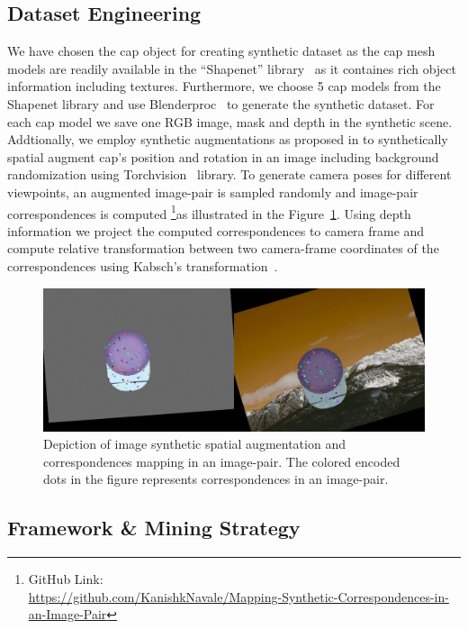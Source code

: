 \subsection{Dataset Engineering}

We have chosen the cap object for creating synthetic dataset as the cap mesh models are readily available in the ``Shapenet'' library~\cite{chang2015shapenet}
as it containes rich object information including textures. Furthermore, we choose 5 cap models from the Shapenet library and use
Blenderproc~\cite{blenderproc} to generate the synthetic dataset.
For each cap model we save one RGB image, mask and depth in the synthetic scene. Addtionally, we employ synthetic augmentations as proposed in \cite{adrian2022efficient}
to synthetically spatial augment cap's position and rotation in an image including background randomization
using Torchvision~\cite{marcel2010torchvision} library. To generate camera poses for different viewpoints,
an augmented image-pair is sampled randomly and image-pair correspondences is computed
\footnote[1]{GitHub Link: \\ \url{https://github.com/KanishkNavale/Mapping-Synthetic-Correspondences-in-an-Image-Pair}}as illustrated in the Figure~\ref{fig:image_augs}.
Using depth information we project the computed correspondences to camera frame and compute relative transformation between two camera-frame coordinates of the correspondences
using Kabsch's transformation~\cite{kabsch}.

\begin{figure}[htb]
    \centering
    \includegraphics[scale=0.2]{images/debug_correspondences.png}
    \caption{Depiction of image synthetic spatial augmentation and correspondences mapping in an image-pair. The colored encoded dots in the figure represents correspondences in an image-pair.}
    \label{fig:image_augs}
\end{figure}

\subsection{Framework \& Mining Strategy}

